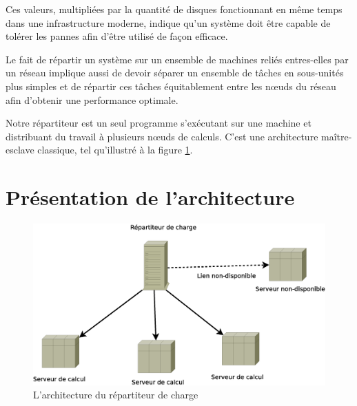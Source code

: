 
Ces valeurs, multipliées par la quantité de disques fonctionnant en même temps dans une infrastructure moderne, indique qu'un système doit
être capable de tolérer les pannes afin d'être utilisé de façon efficace. 

Le fait de répartir un système sur un ensemble de machines reliés entres-elles par un réseau implique aussi de devoir séparer un ensemble de tâches en 
sous-unités plus simples et de répartir ces tâches équitablement entre les nœuds du réseau afin d'obtenir une performance optimale. 

Notre répartiteur est un seul programme s'exécutant sur une machine et distribuant du travail à plusieurs nœuds de calculs.
C'est une architecture maître-esclave classique, tel qu'illustré à la figure \ref{fig:arch_1}.

\section{Présentation de l'architecture}

\begin{figure}
  \includegraphics[width=\linewidth]{Arch_Trad.eps}
  \caption{L'architecture du répartiteur de charge}
  \label{fig:arch_1}
\end{figure}


